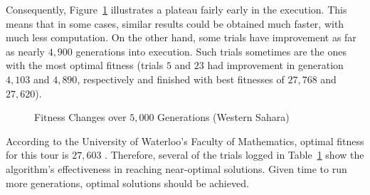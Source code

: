 Consequently, Figure~\ref{fig:tiny-fitnesses} 
illustrates a plateau fairly early in the execution. This means that in 
some cases, similar results could be obtained much faster, with much
less computation. On the other hand, some trials have improvement 
as far as nearly $4,900$ generations into execution. Such trials sometimes
are the ones with the most optimal fitness (\eg trials $5$ and $23$
had improvement in generation $4,103$ and $4,890$, respectively 
and finished with best fitnesses of $27,768$ and $27,620$).
\begin{figure}[h]
	\centering
	\caption{Fitness Changes over $5,000$ Generations (Western Sahara)\label{fig:tiny-fitnesses}}
\end{figure}
According to the University of Waterloo's Faculty of Mathematics, optimal fitness for this tour is $27,603$ \cite{sahara}. Therefore, several of the trials logged in Table~\ref{fig:tiny-fitnesses} show the algorithm's effectiveness in reaching near-optimal solutions. Given time to run more generations, optimal solutions should be achieved.


